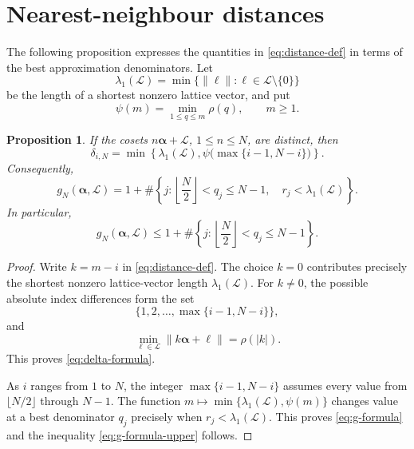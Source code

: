 \documentclass[11pt,reqno]{amsart}
\newtheorem{proposition}[theorem]{Proposition}
\theoremstyle{definition}
\newcommand{\0}{\mbf 0}%
\newcommand{\cL}{\mathcal L}
\newcommand{\balpha}{\boldsymbol{\alpha}}
\newcommand{\card}{\#}
\begin{document}
\section{Nearest-neighbour distances}

The following proposition expresses the quantities in \eqref{eq:distance-def}
in terms of the best approximation denominators. Let
$$
 \lambda_1(\cL)=\min\{\|\ell\|:\ell\in\cL\setminus\{0\}\}
$$
be the length of a shortest nonzero lattice vector, and put
$$
 \psi(m)=\min_{1\le q\le m}\rho(q),
 \qquad m\ge1.
$$

\begin{proposition}\label{prop:distance-formula}
If the cosets $n\balpha+\cL$, $1\le n\le N$, are distinct, then
\begin{equation}\label{eq:delta-formula}
 \delta_{i,N}
 =\min\left\{\lambda_1(\cL),
 \psi\bigl(\max\{i-1,N-i\}\bigr)\right\}.
\end{equation}
Consequently,
\begin{equation}\label{eq:g-formula}
 g_N(\balpha,\cL)
 =1+\card\left\{j:
 \left\lfloor\frac N2\right\rfloor<q_j\le N-1,
 \quad r_j<\lambda_1(\cL)\right\}.
\end{equation}
In particular,
\begin{equation}\label{eq:g-formula-upper}
 g_N(\balpha,\cL)
 \le 1+\card\left\{j:
 \left\lfloor\frac N2\right\rfloor<q_j\le N-1\right\}.
\end{equation}
\end{proposition}

\begin{proof}
Write $k=m-i$ in \eqref{eq:distance-def}. The choice $k=0$ contributes
precisely the shortest nonzero lattice-vector length $\lambda_1(\cL)$. For
$k\ne0$, the possible absolute index differences form the set
$$
 \{1,2,\ldots,\max\{i-1,N-i\}\},
$$
and
$$
 \min_{\ell\in\cL}\|k\balpha+\ell\|=\rho(|k|).
$$
This proves \eqref{eq:delta-formula}.

As $i$ ranges from $1$ to $N$, the integer $\max\{i-1,N-i\}$ assumes
every value from $\lfloor N/2\rfloor$ through $N-1$. The function
$m\mapsto\min\{\lambda_1(\cL),\psi(m)\}$ changes value at a best denominator
$q_j$ precisely when $r_j<\lambda_1(\cL)$. This proves \eqref{eq:g-formula} and the inequality \eqref{eq:g-formula-upper} follows.
\end{proof}
\end{document}
